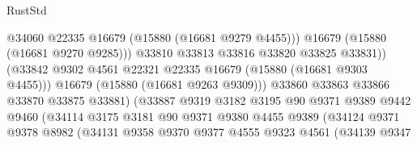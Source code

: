 \begin{lexlean}{RustStd}
\begin{coremodule}
                                            @34060
                                            @22335
                                            @16679
                                            (@15880 (@16681 @9279 @4455)))
                                          @16679
                                          (@15880 (@16681 @9270 @9285)))
                                        @33810
                                        @33813
                                        @33816
                                        @33820
                                        @33825
                                        @33831))
                                    (@33842
                                      @9302
                                      @4561
                                      @22321
                                      @22335
                                      @16679
                                      (@15880 (@16681 @9303 @4455)))
                                    @16679
                                    (@15880 (@16681 @9263 @9309)))
                                  @33860
                                  @33863
                                  @33866
                                  @33870
                                  @33875
                                  @33881)
                                (@33887
                                  @9319
                                  @3182
                                  @3195
                                  @90
                                  @9371
                                  @9389
                                  @9442
                                  @9460
                                  (@34114
                                    @3175
                                    @3181
                                    @90
                                    @9371
                                    @9380
                                    @4455
                                    @9389
                                    (@34124
                                      @9371
                                      @9378
                                      @8982
                                      (@34131
                                        @9358
                                        @9370
                                        @9377
                                        @4555
                                        @9323
                                        @4561
                                        (@34139
                                          @9347

\end{coremodule}
\end{lexlean}
